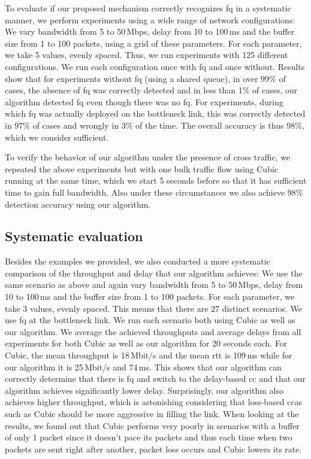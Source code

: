 \documentclass[runningheads]{llncs}
\begin{document}
To evaluate if our proposed mechanism correctly recognizes \gls{fq} in a systematic manner, we perform experiments using a wide range of network configurations: We vary bandwidth from 5 to 50\,Mbps, delay from 10 to 100\,ms and the buffer size from 1 to 100 packets, using a grid of these parameters. For each parameter, we take 5 values, evenly spaced. Thus, we run experiments with 125 different configurations. We run each configuration once with \gls{fq} and once without. Results show that for experiments without \gls{fq} (using a shared queue), in over 99\% of cases, the absence of \gls{fq} was correctly detected and in less than 1\% of cases, our algorithm detected \gls{fq} even though there was no \gls{fq}. For experiments, during which \gls{fq} was actually deployed on the bottleneck link, this was correctly detected in 97\% of cases and wrongly in 3\% of the time. The overall accuracy is thus 98\%, which we consider sufficient. 

To verify the behavior of our algorithm under the presence of cross traffic, we repeated the above experiments but with one bulk traffic flow using Cubic running at the same time, which we start 5 seconds before so that it has sufficient time to gain full bandwidth. Also under these circumstances we also achieve 98\% detection accuracy using our algorithm. 

\subsection{Systematic evaluation}

Besides the examples we provided, we also conducted a more systematic comparison of the throughput and delay that our algorithm achieves: We use the same scenario as above and again vary bandwidth from 5 to 50\,Mbps, delay from 10 to 100\,ms and the buffer size from 1 to 100 packets. For each parameter, we take 3 values, evenly spaced. This means that there are 27 distinct scenarios. We use \gls{fq} at the bottleneck link. We run each scenario both using Cubic as well as our algorithm. We average the achieved throughputs and average delays from all experiments for both Cubic as well as our algorithm for 20 seconds each. For Cubic, the mean throughput is 18\,Mbit/s and the mean \gls{rtt} is 109\,ms while for our algorithm it is 25\,Mbit/s and 74\,ms. This shows that our algorithm can correctly determine that there is \gls{fq} and switch to the delay-based \gls{cc} and that our algorithm achieves significantly lower delay. Surprisingly, our algorithm also achieves higher throughput, which is astonishing considering that loss-based \glspl{cca} such as Cubic should be more aggressive in filling the link. When looking at the results, we found out that Cubic performs very poorly in scenarios with a buffer of only 1 packet since it doesn't pace its packets and thus each time when two packets are sent right after another, packet loss occurs and Cubic lowers its rate. 
\end{document}
